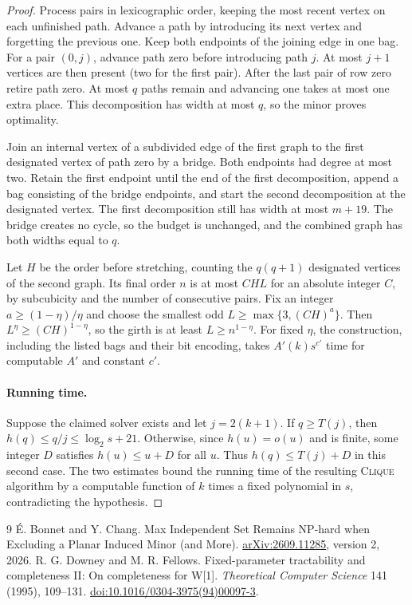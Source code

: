 \documentclass[11pt]{article}
\begin{document}
\begin{proof}
Process pairs in lexicographic order, keeping the most recent vertex on
each unfinished path. Advance a path by introducing its next vertex and
forgetting the previous one. Keep both endpoints of the joining edge
in one bag. For a pair \((0,j)\), advance path zero before introducing
path \(j\). At most \(j+1\) vertices are then present (two for the first
pair). After the last pair of row zero retire path zero. At most \(q\)
paths remain and advancing one takes at most one extra place. This
decomposition has width at most \(q\), so the minor proves optimality.

Join an internal vertex of a subdivided edge of the first graph to the
first designated vertex of path zero by a bridge. Both endpoints had
degree at most two. Retain the first endpoint until the end of the first
decomposition, append a bag consisting of the bridge endpoints, and
start the second decomposition at the designated vertex. The first
decomposition still has width at most \(m+19\). The bridge creates no
cycle, so the budget is unchanged, and the combined graph has both widths
equal to \(q\).

Let \(H\) be the order before stretching, counting the \(q(q+1)\)
designated vertices of the second graph. Its final order \(n\) is at
most \(CHL\) for an absolute integer \(C\), by subcubicity and the
number of consecutive pairs. Fix an integer \(a\ge (1-\eta)/\eta\)
and choose the smallest odd \(L\ge\max\{3,(CH)^a\}\).
Then \(L^\eta\ge(CH)^{1-\eta}\), so the girth is at least
\(L\ge n^{1-\eta}\).
For fixed \(\eta\), the construction, including the listed bags and
their bit encoding, takes \(A'(k)s^{c'}\) time for computable \(A'\)
and constant \(c'\).

\paragraph{Running time.}
Suppose the claimed solver exists and let \(j=2(k+1)\).
If \(q\ge T(j)\), then \(h(q)\le q/j\le \log_2 s+21\).
Otherwise, since \(h(u)=o(u)\) and is finite, some integer \(D\)
satisfies \(h(u)\le u+D\) for all \(u\). Thus \(h(q)\le T(j)+D\)
in this second case. The two estimates bound the running time of
the resulting \textsc{Clique} algorithm by a computable function
of \(k\) times a fixed polynomial in \(s\), contradicting the hypothesis.
\end{proof}

\begin{thebibliography}{9}
 \'E. Bonnet and Y. Chang.
Max Independent Set Remains NP-hard when Excluding a Planar Induced
Minor (and More). \href{https://doi.org/10.48550/arXiv.2609.11285}{arXiv:2609.11285},
version 2, 2026.
 R. G. Downey and M. R. Fellows.
Fixed-parameter tractability and completeness II: On completeness
for W[1]. \emph{Theoretical Computer Science} 141 (1995), 109--131.
\href{https://doi.org/10.1016/0304-3975(94)00097-3}{doi:10.1016/0304-3975(94)00097-3}.
\end{thebibliography}
\end{document}
